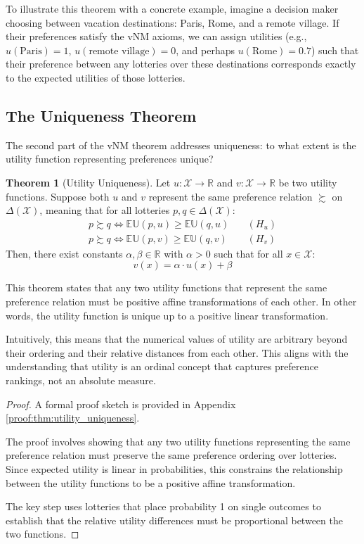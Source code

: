 \documentclass{article}
\theoremstyle{definition}
\newtheorem{theorem}[definition]{Theorem}
\newcommand{\R}{\mathbb{R}}
\newcommand{\X}{\mathcal{X}}
\newcommand{\EU}{\mathbb{EU}}
\newcommand{\DeltaX}{\Delta(\X)} %
\newcommand{\pref}{\succsim} %
\begin{document}
To illustrate this theorem with a concrete example, imagine a decision maker choosing between vacation destinations: Paris, Rome, and a remote village. If their preferences satisfy the vNM axioms, we can assign utilities (e.g., $u(\text{Paris}) = 1$, $u(\text{remote village}) = 0$, and perhaps $u(\text{Rome}) = 0.7$) such that their preference between any lotteries over these destinations corresponds exactly to the expected utilities of those lotteries.

\subsection{The Uniqueness Theorem}

The second part of the vNM theorem addresses uniqueness: to what extent is the utility function representing preferences unique?

\begin{theorem}[Utility Uniqueness]\label{thm:utility_uniqueness}
Let $u: \X \to \R$ and $v: \X \to \R$ be two utility functions. Suppose both $u$ and $v$ represent the same preference relation $\pref$ on $\DeltaX$, meaning that for all lotteries $p, q \in \DeltaX$:
\begin{align}
    p \pref q \iff \EU(p, u) \ge \EU(q, u) \quad &(H_u) \\
    p \pref q \iff \EU(p, v) \ge \EU(q, v) \quad &(H_v)
\end{align}
Then, there exist constants $\alpha, \beta \in \R$ with $\alpha > 0$ such that for all $x \in \X$:
\[ v(x) = \alpha \cdot u(x) + \beta \]
\end{theorem}

This theorem states that any two utility functions that represent the same preference relation must be positive affine transformations of each other. In other words, the utility function is unique up to a positive linear transformation.

Intuitively, this means that the numerical values of utility are arbitrary beyond their ordering and their relative distances from each other. This aligns with the understanding that utility is an ordinal concept that captures preference rankings, not an absolute measure.

\begin{proof}
A formal proof sketch is provided in Appendix \ref{proof:thm:utility_uniqueness}.

The proof involves showing that any two utility functions representing the same preference relation must preserve the same preference ordering over lotteries. Since expected utility is linear in probabilities, this constrains the relationship between the utility functions to be a positive affine transformation.

The key step uses lotteries that place probability 1 on single outcomes to establish that the relative utility differences must be proportional between the two functions.
\end{proof}
\end{document}
